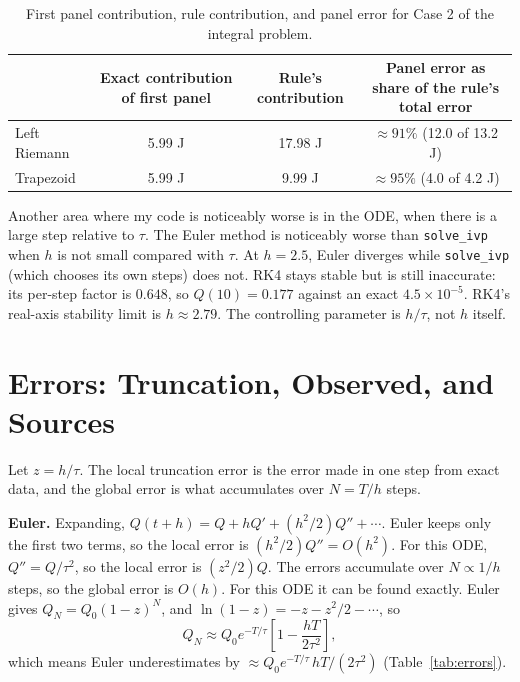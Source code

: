 \documentclass[11pt]{article}
\begin{document}
\begin{table}[htbp]
  \centering
  \caption{First panel contribution, rule contribution, and panel error for Case 2 of the integral problem.}
  \label{tab:panel}
  \begin{tabular}{l c c c}
    \toprule
    & Exact contribution of first panel & Rule's contribution & Panel error as share of the rule's total error \\
    \midrule
    Left Riemann & 5.99 J & 17.98 J & $\approx 91\%$ (12.0 of 13.2 J) \\
    Trapezoid    & 5.99 J &  9.99 J & $\approx 95\%$ (4.0 of 4.2 J) \\
    \bottomrule
  \end{tabular}
\end{table}

Another area where my code is noticeably worse is in the ODE, when there is a large step relative to $\tau$. The Euler method is noticeably worse than \texttt{solve\_ivp} when $h$ is not small compared with $\tau$. At $h = 2.5$, Euler diverges while \texttt{solve\_ivp} (which chooses its own steps) does not. RK4 stays stable but is still inaccurate: its per-step factor is $0.648$, so $Q(10) = 0.177$ against an exact $4.5\times10^{-5}$. RK4's real-axis stability limit is $h \approx 2.79$. The controlling parameter is $h/\tau$, not $h$ itself.

\section{Errors: Truncation, Observed, and Sources}
\label{sec:errors}

Let $z = h/\tau$. The local truncation error is the error made in one step from exact data, and the global error is what accumulates over $N = T/h$ steps.

\textbf{Euler.} Expanding, $Q(t+h) = Q + hQ' + (h^2/2)Q'' + \cdots$. Euler keeps only the first two terms, so the local error is $(h^2/2)Q'' = O(h^2)$. For this ODE, $Q'' = Q/\tau^2$, so the local error is $(z^2/2)Q$. The errors accumulate over $N \propto 1/h$ steps, so the global error is $O(h)$. For this ODE it can be found exactly. Euler gives $Q_N = Q_0(1 - z)^N$, and $\ln(1 - z) = -z - z^2/2 - \cdots$, so
\begin{equation}
  Q_N \approx Q_0 e^{-T/\tau}\left[1 - \frac{hT}{2\tau^2}\right],
\end{equation}
which means Euler underestimates by $\approx Q_0 e^{-T/\tau}\, hT/(2\tau^2)$ (Table~\ref{tab:errors}).
\end{document}
